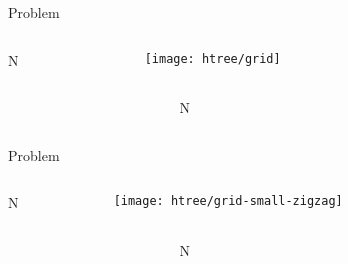 
\begin{frame}{Problem}

\begin{columns}
\begin{column}{0.225\textwidth}
\raggedleft
\Huge
N
\end{column}
\begin{column}{0.65\textwidth}
\centering
\texttt{[image: htree/grid]}
\end{column}
\begin{column}{0.225\textwidth}
\end{column}
\end{columns}

\begin{columns}
\begin{column}{0.225\textwidth}
\end{column}
\begin{column}{0.65\textwidth}
\centering
\Huge
N
\end{column}
\begin{column}{0.225\textwidth}
\end{column}
\end{columns}

\end{frame}

\begin{frame}{Problem}

\begin{columns}
\begin{column}{0.225\textwidth}
\raggedleft
\Huge
N
\end{column}
\begin{column}{0.65\textwidth}
\centering
\texttt{[image: htree/grid-small-zigzag]}
\end{column}
\begin{column}{0.225\textwidth}
\end{column}
\end{columns}

\begin{columns}
\begin{column}{0.225\textwidth}
\end{column}
\begin{column}{0.65\textwidth}
\centering
\Huge
N
\end{column}
\begin{column}{0.225\textwidth}
\end{column}
\end{columns}

\end{frame}


